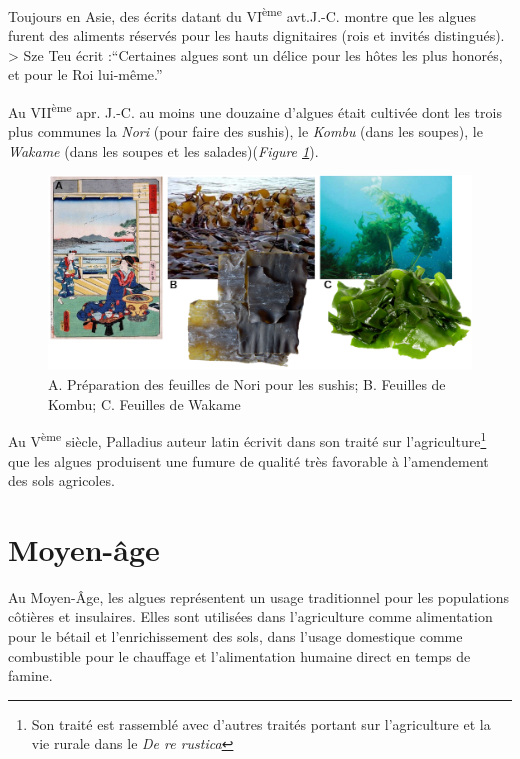 \documentclass[
]{book}
\begin{document}
Toujours en Asie, des écrits datant du VI\textsuperscript{ème} avt.J.-C. montre que les algues furent des aliments réservés pour les hauts dignitaires (rois et invités distingués).
\textgreater{} Sze Teu écrit :``Certaines algues sont un délice pour les hôtes les plus honorés, et pour le Roi lui-même.''

Au VII\textsuperscript{ème} apr. J.-C. au moins une douzaine d'algues était cultivée dont les trois plus communes la \emph{Nori} (pour faire des sushis), le \emph{Kombu} (dans les soupes), le \emph{Wakame} (dans les soupes et les salades)(\emph{Figure \ref{fig:japonalgues}}).

\begin{figure}

{\centering \includegraphics{images/japon_algues} 

}

\caption{A. Préparation des feuilles de Nori pour les sushis; B. Feuilles de Kombu; C. Feuilles de Wakame }\label{fig:japonalgues}
\end{figure}

Au V\textsuperscript{ème} siècle, Palladius auteur latin écrivit dans son traité sur l'agriculture\footnote{Son traité est rassemblé avec d'autres traités portant sur l'agriculture et la vie rurale dans le \emph{De re rustica}} que les algues produisent une fumure de qualité très favorable à l'amendement des sols agricoles.

\hypertarget{moyen-uxe2ge}{%
\section{Moyen-âge}\label{moyen-uxe2ge}}

Au Moyen-Âge, les algues représentent un usage traditionnel pour les populations côtières et insulaires. Elles sont utilisées dans l'agriculture comme alimentation pour le bétail et l'enrichissement des sols, dans l'usage domestique comme combustible pour le chauffage et l'alimentation humaine direct en temps de famine.
\end{document}
